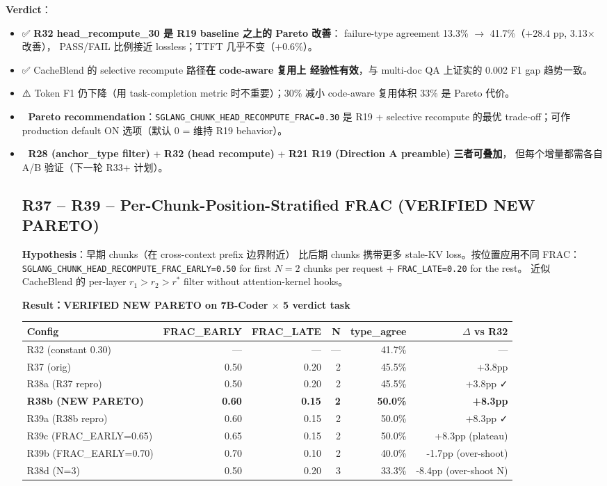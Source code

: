 \documentclass[11pt,a4paper]{article}
\begin{document}
\textbf{Verdict}：
\begin{itemize}
  \item ✅ \textbf{R32 head\_recompute\_30 是 R19 baseline 之上的 Pareto 改善}：
        failure-type agreement 13.3\% $\to$ 41.7\%（$+28.4$ pp, 3.13$\times$ 改善），
        PASS/FAIL 比例接近 lossless；TTFT 几乎不变（$+0.6$\%）。
  \item ✅ CacheBlend 的 selective recompute 路径\textbf{在 code-aware 复用上
        经验性有效}，与 multi-doc QA 上证实的 0.002 F1 gap 趋势一致。
  \item ⚠️ Token F1 仍下降（用 task-completion metric 时不重要）；30\% 减小
        code-aware 复用体积 33\% 是 Pareto 代价。
  \item 📌 \textbf{Pareto recommendation}：\texttt{SGLANG\_CHUNK\_HEAD\_RECOMPUTE\_FRAC=0.30}
        是 R19 + selective recompute 的最优 trade-off；可作 production default
        ON 选项（默认 0 = 维持 R19 behavior）。
  \item 📌 \textbf{R28 (anchor\_type filter)} + \textbf{R32 (head recompute)}
        + \textbf{R21 R19 (Direction A preamble)} \textbf{三者可叠加}，
        但每个增量都需各自 A/B 验证（下一轮 R33+ 计划）。

\subsection*{R37 -- R39 -- Per-Chunk-Position-Stratified FRAC (VERIFIED NEW PARETO)}

\textbf{Hypothesis}：早期 chunks（在 cross-context prefix 边界附近）
比后期 chunks 携带更多 stale-KV loss。按位置应用不同 FRAC：
\texttt{SGLANG\_CHUNK\_HEAD\_RECOMPUTE\_FRAC\_EARLY=0.50} for first
$N=2$ chunks per request + \texttt{FRAC\_LATE=0.20} for the rest。
近似 CacheBlend 的 per-layer $r_1 > r_2 > r^*$ filter without
attention-kernel hooks。

\textbf{Result：VERIFIED NEW PARETO on 7B-Coder $\times$ 5 verdict task}

\begin{tabular}{@{}lrrrrr@{}}
\toprule
\textbf{Config} & \textbf{FRAC\_EARLY} & \textbf{FRAC\_LATE} & \textbf{N} & \textbf{type\_agree} & $\Delta$ vs R32 \\
\midrule
R32 (constant 0.30)            & ---    & ---    & --- & 41.7\% & --- \\
R37 (orig)                      & 0.50 & 0.20 & 2 & 45.5\% & +3.8pp \\
R38a (R37 repro)                & 0.50 & 0.20 & 2 & 45.5\% & +3.8pp ✓ \\
\textbf{R38b (NEW PARETO)}      & \textbf{0.60} & \textbf{0.15} & \textbf{2} & \textbf{50.0\%} & \textbf{+8.3pp} \\
R39a (R38b repro)               & 0.60 & 0.15 & 2 & 50.0\% & +8.3pp ✓ \\
R39c (FRAC\_EARLY=0.65)         & 0.65 & 0.15 & 2 & 50.0\% & +8.3pp (plateau) \\
R39b (FRAC\_EARLY=0.70)         & 0.70 & 0.10 & 2 & 40.0\% & -1.7pp (over-shoot) \\
R38d (N=3)                      & 0.50 & 0.20 & 3 & 33.3\% & -8.4pp (over-shoot N) \\
\bottomrule
\end{tabular}


\end{itemize}
\end{document}
